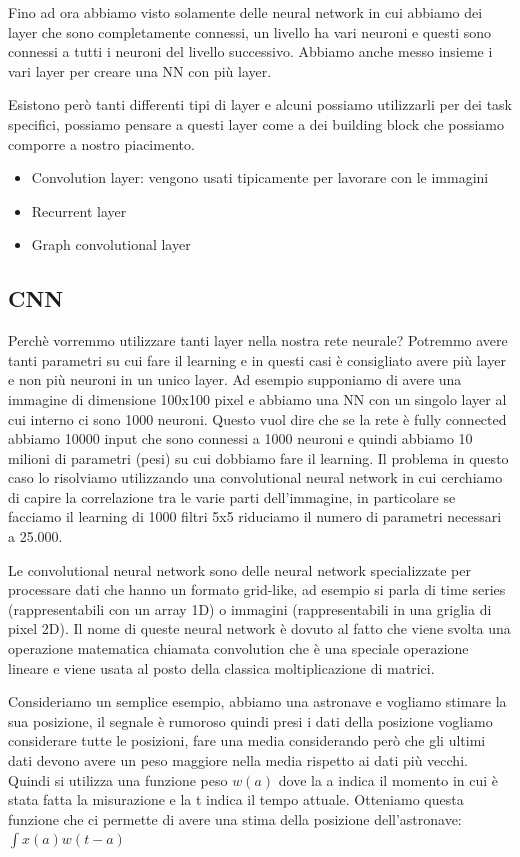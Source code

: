 \documentclass[14pt]{extreport}
\begin{document}
Fino ad ora abbiamo visto solamente delle neural network in cui abbiamo dei layer che sono completamente connessi, un livello ha vari neuroni e questi
sono connessi a tutti i neuroni del livello successivo. Abbiamo anche messo insieme i vari layer per creare una NN con più layer.

Esistono però tanti differenti tipi di layer e alcuni possiamo utilizzarli per dei task specifici, possiamo pensare a questi layer come a dei building
block che possiamo comporre a nostro piacimento.
\begin{itemize}
\item Convolution layer: vengono usati tipicamente per lavorare con le immagini
\item Recurrent layer
\item Graph convolutional layer
\end{itemize}
 
\subsection{CNN}

Perchè vorremmo utilizzare tanti layer nella nostra rete neurale? Potremmo avere tanti parametri su cui fare il learning e in questi casi è
consigliato avere più layer e non più neuroni in un unico layer. Ad esempio supponiamo di avere una immagine di dimensione 100x100 pixel e abbiamo una
NN con un singolo layer al cui interno ci sono 1000 neuroni. Questo vuol dire che se la rete è fully connected abbiamo 10000 input che sono connessi a
1000 neuroni e quindi abbiamo 10 milioni di parametri (pesi) su cui dobbiamo fare il learning. Il problema in questo caso lo risolviamo utilizzando
una convolutional neural network in cui cerchiamo di capire la correlazione tra le varie parti dell'immagine, in particolare se facciamo il learning
di 1000 filtri 5x5 riduciamo il numero di parametri necessari a 25.000.

Le convolutional neural network sono delle neural network specializzate per processare dati che hanno un formato grid-like, ad esempio si parla di 
time series (rappresentabili con un array 1D) o immagini (rappresentabili in una griglia di pixel 2D).
Il nome di queste neural network è dovuto al fatto che viene svolta una operazione matematica chiamata convolution
che è una speciale operazione lineare e viene usata al posto della classica moltiplicazione di matrici.

Consideriamo un semplice esempio, abbiamo una astronave e vogliamo stimare la sua posizione, il segnale è rumoroso
quindi presi i dati della posizione vogliamo considerare tutte le posizioni, fare una media considerando però che gli ultimi
dati devono avere un peso maggiore nella media rispetto ai dati più vecchi.
Quindi si utilizza una funzione peso $w(a)$ dove la a indica il momento in cui è stata fatta la misurazione e la t 
indica il tempo attuale.
Otteniamo questa funzione che ci permette di avere una stima della posizione dell'astronave:
$\int x(a)w(t-a)$
\end{document}
